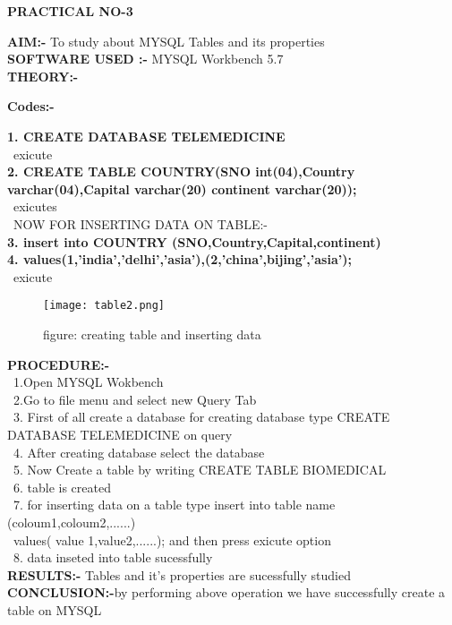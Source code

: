 \documentclass[a4paper,0pt]{article}
\begin{document}
\begin{center}
\textbf{\LARGE PRACTICAL NO-3}\\[1CM]
\end{center}
\textbf{AIM:-} To study about MYSQL Tables and its properties \\[5mm]
\textbf{SOFTWARE USED :-} MYSQL Workbench 5.7\\[5mm]
\textbf{THEORY:-}\\[2MM]
\begin{center}
\textbf{\LARGE Codes:-}\\[2mm]
\end{center}
\textbf{ 1. CREATE DATABASE TELEMEDICINE}\\[2mm]
\ exicute\\[2mm]
\textbf{2. CREATE TABLE COUNTRY(SNO int(04),Country varchar(04),Capital varchar(20) continent varchar(20));}\\[2mm]
\ exicutes\\[5mm]
\ NOW FOR INSERTING DATA ON TABLE:- \\[2mm]
\textbf{ 3. insert into COUNTRY (SNO,Country,Capital,continent)}\\[1mm]
\textbf{ 4. values(1,'india','delhi','asia'),(2,'china',bijing','asia');}\\[2mm]
\ exicute\\[10mm]
\begin{figure}[h!]
\texttt{[image: table2.png]}
\centering
\caption{figure: creating table and inserting data}
\end{figure}
\newpage
\textbf{PROCEDURE:-}\\[2MM]
\ 1.Open MYSQL Wokbench\\[2mm]
\ 2.Go to file menu and select new Query Tab\\[2mm]
\ 3. First of all create a database for creating database type CREATE DATABASE TELEMEDICINE on query\\[2mm]
\ 4. After creating database select the database \\[2mm]
\  5. Now Create a table by writing  CREATE TABLE BIOMEDICAL \\[2mm]
\ 6. table is created \\[2mm]
\ 7. for inserting data on a table type insert into table name (coloum1,coloum2,......)\\[2mm]
\ values( value 1,value2,......); and then press exicute option\\[2mm]
\ 8. data inseted into table sucessfully\\[5mm] 
\textbf{RESULTS:-} Tables and it's properties are sucessfully studied \\[5mm]
\textbf{CONCLUSION:-}by performing above operation we have successfully create a table on MYSQL\\
\newpage
\end{document}

